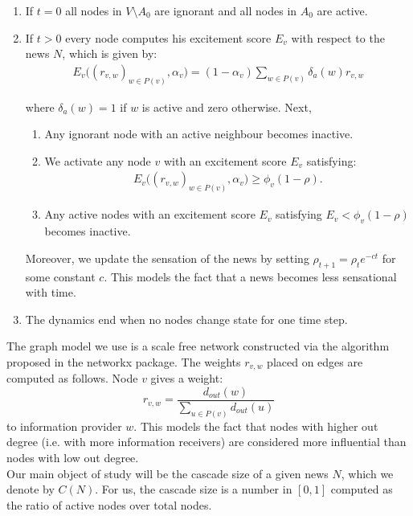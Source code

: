 \documentclass[10pt]{article}
\begin{document}
\begin{enumerate}
\item If $t = 0$ all nodes in $V \setminus A_0$ are ignorant and all nodes in $A_0$ are active.
\item If $t > 0$ every node computes his excitement score $E_v$ with respect to the news $N$, which is given by:
\begin{align*}
E_v\Big((r_{v,w})_{w \in P(v)}, \alpha_v \Big) =  (1-\alpha_v)\sum_{w \in P(v)} \delta_a(w)r_{v,w}
\end{align*}

where $\delta_a(w) = 1$ if $w$ is active and zero otherwise. Next,
\begin{enumerate}
\item Any ignorant node with an active neighbour becomes inactive.
\item We activate any node $v$ with an excitement score $E_v$ satisfying:
\begin{align*}
E_v\Big((r_{v,w})_{w \in P(v)}, \alpha_v \Big) \geq \phi_v(1-\rho).
\end{align*}
\item Any active nodes with an excitement score $E_v$ satisfying $E_v < \phi_v(1-\rho)$ becomes inactive.

\end{enumerate}
Moreover, we update the sensation of the news by setting $\rho_{t+1} = \rho_{t}e^{-ct}$ for some constant $c$. This models the fact that a news becomes less sensational with time.
\item The dynamics end when no nodes change state for one time step.
\end{enumerate}

The graph model we use is a scale free network constructed via the algorithm proposed in the networkx package. The weights $r_{v,w}$  placed on edges are computed as follows. Node $v$ gives a weight:
\[ r_{v,w} = \frac{d_{out}(w)}{\sum_{u \in P(v) }d_{out}(u)} \]
to information provider $w$. This models the fact that nodes with higher out degree (i.e. with more information receivers) are considered more influential than nodes with low out degree. \\

Our main object of study will be the cascade size of a given news $N$, which we denote by $C(N)$. For us, the cascade size is a number in $[0,1]$ computed as the ratio of active nodes over total nodes.
\end{document}
